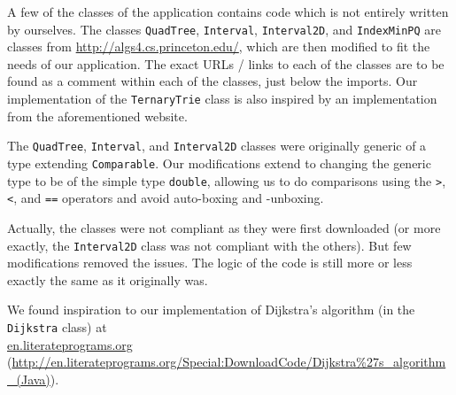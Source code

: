 A few of the classes of the application contains code which is not entirely written by ourselves. The classes \texttt{QuadTree}, \texttt{Interval}, \texttt{Interval2D}, and \texttt{IndexMinPQ} are classes from \url{http://algs4.cs.princeton.edu/}, which are then modified to fit the needs of our application. The exact URLs / links to each of the classes are to be found as a comment within each of the classes, just below the imports. Our implementation of the \texttt{TernaryTrie} class is also inspired by an implementation from the  aforementioned website.

The \texttt{QuadTree}, \texttt{Interval}, and \texttt{Interval2D} classes were originally generic of a type extending \texttt{Comparable}. Our modifications extend to changing the generic type to be of the simple type \texttt{double}, allowing us to do comparisons using the \texttt{>}, \texttt{<}, and \texttt{==} operators and avoid auto-boxing and -unboxing.

Actually, the classes were not compliant as they were first downloaded (or more exactly, the \texttt{Interval2D} class was not compliant with the others). But few modifications removed the issues. The logic of the code is still more or less exactly the same as it originally was.

We found inspiration to our implementation of Dijkstra's algorithm (in the \texttt{Dijkstra} class) at \\ \href{http://en.literateprograms.org/Special:DownloadCode/Dijkstra\%27s_algorithm_(Java)}{en.literateprograms.org} \\ (\url{http://en.literateprograms.org/Special:DownloadCode/Dijkstra\%27s_algorithm_(Java)}).